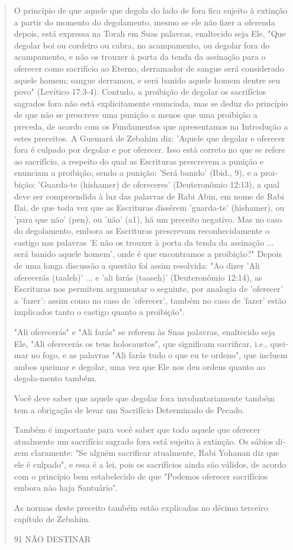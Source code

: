 \begin{quote}
O princípio de que aquele que degola do lado de fora fica sujeito à
extinção a partir do momento do degolamento, mesmo se ele não fizer a
oferen­da depois, está expressa na Torah em Suas palavras, enaltecido
seja Ele, "Que de­golar boi ou cordeiro ou cabra, no acampamento, ou
degolar fora do acampa­mento, e não os trouxer à porta da tenda da
assinação para o oferecer como sa­crifício ao Eterno, derramador de
sangue será considerado aquele homem; san­gue derramou, e será banido
aquele homem dentre seu povo" (Levítico 17:3-4). Contudo, a proibição de
degolar os sacrifícios sagrados fora não está explicita­mente enunciada,
mas se deduz do princípio de que não se prescreve uma puni­ção a menos
que uma proibição a preceda, de acordo com os Fundamentos que
apresentamos na Introdução a estes preceitos. A Guemará de Zebahim diz:
'Aquele que degolar e oferecer fora é culpado por degolar e por
oferecer. Isso está corre­to no que se refere ao sacrifício, a respeito
do qual as Escrituras prescrevem a punição 
e enunciam a proibição, sendo a punição: 'Será banido' (Ibid., 9),
e a proi­bição: 'Guarda-te (hishamer) de ofereceres' (Deuteronômio
12:13), a qual deve ser compreendida à luz das palavras de Rabi Abin, em
nome de Rabi Ilai, de que toda vez que as Escrituras dissérem
'guarda-te' (hishamer), ou 'para que não' (pen), ou 'não' (a1), há um
preceito negativo. Mas no caso do degolamento, em­bora as Escrituras
prescrevam reconhecidamente o castigo nas palavras 'E não os trouxer à
porta da tenda da assinação ... será banido aquele homem', onde é que
encontramos a proibição?" Depois de uma longa discussão a questão foi
assim resolvida: "Ao dizer 'Ali oferecerás (taaleh)' ... e 'ali farás
(taaseh)' (Deute­ronômio 12:14), as Escrituras nos permitem argumentar o
seguinte, por analo­gia de 'oferecer' a 'fazer': assim como no caso de
'oferecer', também no caso de 'fazer' estão implicados tanto o castigo
quanto a proibição".

"Ali oferecerás" e "Ali farás" se referem às Suas palavras, enaltecido
seja Ele, "Ali oferecerás os teus holocaustos", que significam
sacrificar, i.e., quei­mar no fogo, e as palavras "Ali farás tudo o que
eu te ordeno", que incluem ambos queimar e degolar, uma vez que Ele nos
deu ordens quanto ao degola-mento também.

Você deve saber que aquele que degolar fora involuntariamente tam­bém
tem a obrigação de levar um Sacrifício Determinado de Pecado.

Também é importante para você saber que todo aquele que ofere­cer
atualmente um sacrifício sagrado fora está sujeito à extinção. Os sábios
di­zem claramente: "Se alguém sacrificar atualmente, Rabi Yohanan diz
que ele é culpado", e essa é a lei, pois os sacrifícios ainda são
válidos, de acordo com o princípio bem estabelecido de que "Podemos
oferecer sacrifícios embora não haja Santuário".

As normas deste preceito também estão explicadas no décimo ter­ceiro
capítulo de Zebahim.

91 NÃO DESTINAR
\end{quote}

